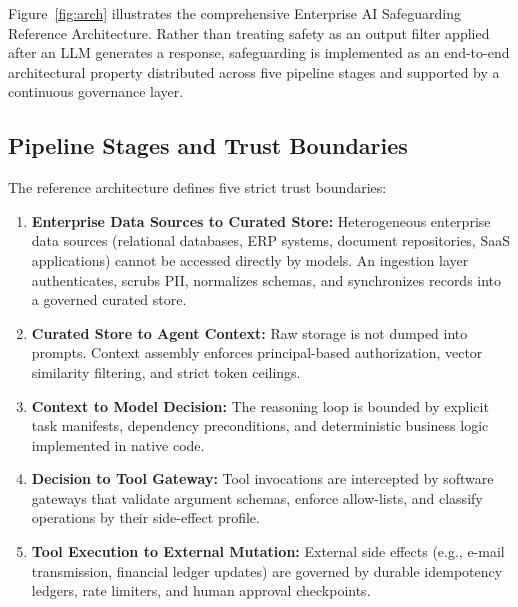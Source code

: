 \documentclass[10pt,a4paper,twocolumn]{article}
\begin{document}
Figure~\ref{fig:arch} illustrates the comprehensive Enterprise AI Safeguarding Reference Architecture. Rather than treating safety as an output filter applied after an LLM generates a response, safeguarding is implemented as an end-to-end architectural property distributed across five pipeline stages and supported by a continuous governance layer.

\subsection{Pipeline Stages and Trust Boundaries}
The reference architecture defines five strict trust boundaries:
\begin{enumerate}[leftmargin=*]
  \item \textbf{Enterprise Data Sources to Curated Store:} Heterogeneous enterprise data sources (relational databases, ERP systems, document repositories, SaaS applications) cannot be accessed directly by models. An ingestion layer authenticates, scrubs PII, normalizes schemas, and synchronizes records into a governed curated store.
  \item \textbf{Curated Store to Agent Context:} Raw storage is not dumped into prompts. Context assembly enforces principal-based authorization, vector similarity filtering, and strict token ceilings.
  \item \textbf{Context to Model Decision:} The reasoning loop is bounded by explicit task manifests, dependency preconditions, and deterministic business logic implemented in native code.
  \item \textbf{Decision to Tool Gateway:} Tool invocations are intercepted by software gateways that validate argument schemas, enforce allow-lists, and classify operations by their side-effect profile.
  \item \textbf{Tool Execution to External Mutation:} External side effects (e.g., e-mail transmission, financial ledger updates) are governed by durable idempotency ledgers, rate limiters, and human approval checkpoints.
\end{enumerate}
\end{document}

